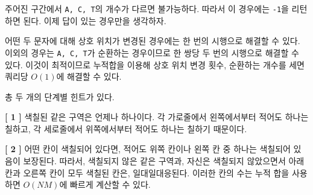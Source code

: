 \begin{hint}
    주어진 구간에서 \texttt{A, C, T}의 개수가 다르면 불가능하다. 따라서 이 경우에는 \texttt{-1}을 리턴하면 된다. 이제 답이 있는 경우만을 생각하자.

    어떤 두 문자에 대해 상호 위치가 변경된 경우에는 한 번의 시행으로 해결할 수 있다. 이외의 경우는 \texttt{A, C, T}가 순환하는 경우이므로 한 쌍당 두 번의 시행으로 해결할 수 있다. 이것이 최적이므로 누적합을 이용해 상호 위치 변경 횟수, 순환하는 개수를 세면 쿼리당 $O(1)$에 해결할 수 있다.
\end{hint}

\begin{hint}
    총 두 개의 단계별 힌트가 있다.
    
    \textbf{[ 1 ]} \newline
    색칠된 같은 구역은 언제나 하나이다. 각 가로줄에서 왼쪽에서부터 적어도 하나는 칠하고, 각 세로줄에서 위쪽에서부터 적어도 하나는 칠하기 때문이다.

    \textbf{[ 2 ]} \newline
    어떤 칸이 색칠되어 있다면, 적어도 위쪽 칸이나 왼쪽 칸 중 하나는 색칠되어 있음이 보장된다. 따라서, 색칠되지 않은 같은 구역과, 자신은 색칠되지 않았으면서 아래 칸과 오른쪽 칸이 모두 색칠된 칸은, 일대일대응된다. 이러한 칸의 수는 누적 합을 사용하면 $O(NM)$에 빠르게 계산할 수 있다.
\end{hint}

